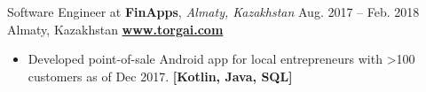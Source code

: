 \cveventflat
{Software Engineer at }
{\textbf{FinApps}, \textit{Almaty, Kazakhstan}}
{Aug. 2017 -- Feb. 2018}
{Almaty, Kazakhstan}
\newline
\href{https://torgai.com/}{\textbf{www.torgai.com}}
\begin{itemize}
    \item Developed point-of-sale Android app for local entrepreneurs with >100 customers as of Dec 2017.
    \textbf{[Kotlin, Java, SQL]}
\end{itemize}
